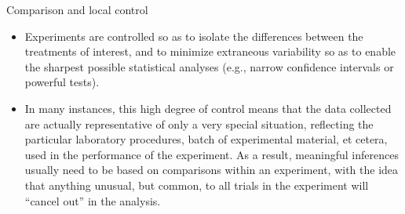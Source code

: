 \documentclass[
  ignorenonframetext,
  aspectratio=169]{beamer}
\providecommand{\tightlist}{%
  \setlength{\itemsep}{0pt}\setlength{\parskip}{0pt}}
\begin{document}
\begin{frame}{Comparison and local control}
\protect\hypertarget{comparison-and-local-control}{}
\begin{itemize}[<+->]
\tightlist
\item
  Experiments are controlled so as to isolate the differences between
  the treatments of interest, and to minimize extraneous variability so
  as to enable the sharpest possible statistical analyses (e.g., narrow
  confidence intervals or powerful tests).
\item
  In many instances, this high degree of control means that the data
  collected are actually representative of only a very special
  situation, reflecting the particular laboratory procedures, batch of
  experimental material, et cetera, used in the performance of the
  experiment. As a result, meaningful inferences usually need to be
  based on comparisons within an experiment, with the idea that anything
  unusual, but common, to all trials in the experiment will ``cancel
  out'' in the analysis.
\end{itemize}
\end{frame}
\end{document}
